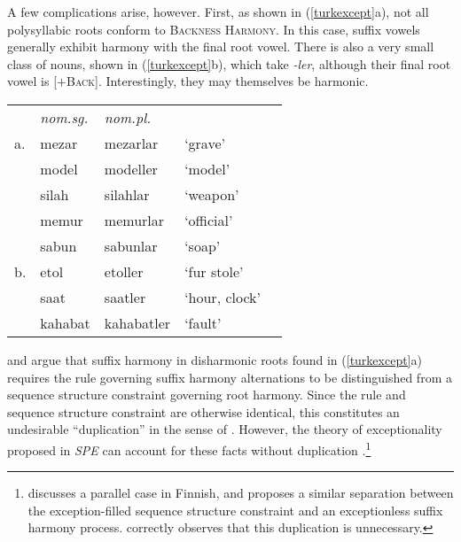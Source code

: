 A few complications arise, however. First, as shown in (\ref{turkexcept}a), not all polysyllabic roots conform to \textsc{Backness Harmony}. In this case, suffix vowels generally exhibit harmony with the final root vowel. There is also a very small class of nouns, shown in (\ref{turkexcept}b), which take \emph{-ler}, although their final root vowel is [$+$\textsc{Back}]. Interestingly, they may themselves be harmonic.

\begin{example} 
\label{turkexcept}
\begin{tabular}{lllll}
   & \emph{nom.sg.} & \emph{nom.pl.}&                    \\
a. & {mezar}        & {mezarlar}    & `grave'       & \citep{TELL}       \\
   & {model}        & {modeller}    & `model'                            \\
   & {silah}        & {silahlar}    & `weapon'                           \\
   & {memur}        & {memurlar}    & `official'                         \\
   & {sabun}        & {sabunlar}    & `soap'                             \\
b. & {etol}         & {etoller}     & `fur stole'   & \citep{Goksel2005} \\
   & {saat}         & {saatler}     & `hour, clock' 	              \\
   & {kahabat}      & {kahabatler}  & `fault'       \\
\end{tabular}
\end{example}

\citet[212]{A74} and \citet{Iverson1978} argue that suffix harmony in disharmonic roots found in (\ref{turkexcept}a) requires the rule governing suffix harmony alternations to be distinguished from a sequence structure constraint governing root harmony. Since the rule and sequence structure constraint are otherwise identical, this constitutes an undesirable ``duplication'' in the sense of \citealt{Kisseberth1970b}. However, the theory of exceptionality proposed in \emph{SPE} can account for these facts without duplication \citep[197f.]{Zonneveld1978}.\footnote{\citet[29f.]{Kiparsky1968} discusses a parallel case in Finnish, and proposes a similar separation between the exception-filled sequence structure constraint and an exceptionless suffix harmony process. \citet[171f.]{Howard1972} correctly observes that this duplication is unnecessary.}

